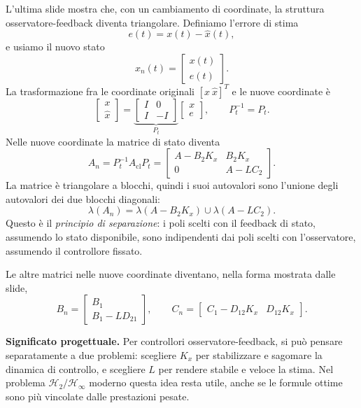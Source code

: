 \documentclass[11pt,a4paper]{article}
\begin{document}
L'ultima slide mostra che, con un cambiamento di coordinate, la struttura osservatore-feedback diventa triangolare. Definiamo l'errore di stima
$$
e(t)=x(t)-\hat{x}(t),
$$
e usiamo il nuovo stato
$$
x_n(t)=
\begin{bmatrix}
x(t)\\
e(t)
\end{bmatrix}.
$$
La trasformazione fra le coordinate originali $[x\ \hat{x}]^T$ e le nuove coordinate \`e
$$
\begin{bmatrix}
x\\
\hat{x}
\end{bmatrix}
=
\underbrace{
\begin{bmatrix}
I & 0\\
I & -I
\end{bmatrix}}_{P_t}
\begin{bmatrix}
x\\
e
\end{bmatrix},
\qquad
P_t^{-1}=P_t.
$$
Nelle nuove coordinate la matrice di stato diventa
$$
A_n
=
P_t^{-1}A_{\mathrm{cl}}P_t
=
\begin{bmatrix}
A-B_2K_x & B_2K_x\\
0 & A-LC_2
\end{bmatrix}.
$$
La matrice \`e triangolare a blocchi, quindi i suoi autovalori sono l'unione degli autovalori dei due blocchi diagonali:
$$
\lambda(A_n)
=
\lambda(A-B_2K_x)
\cup
\lambda(A-LC_2).
$$
Questo \`e il \emph{principio di separazione}: i poli scelti con il feedback di stato, assumendo lo stato disponibile, sono indipendenti dai poli scelti con l'osservatore, assumendo il controllore fissato.

Le altre matrici nelle nuove coordinate diventano, nella forma mostrata dalle slide,
$$
B_n=
\begin{bmatrix}
B_1\\
B_1-LD_{21}
\end{bmatrix},
\qquad
C_n=
\begin{bmatrix}
C_1-D_{12}K_x & D_{12}K_x
\end{bmatrix}.
$$

\begin{focusbox}
\textbf{Significato progettuale.} Per controllori osservatore-feedback, si pu\`o pensare separatamente a due problemi: scegliere $K_x$ per stabilizzare e sagomare la dinamica di controllo, e scegliere $L$ per rendere stabile e veloce la stima. Nel problema $\mathcal{H}_2/\mathcal{H}_\infty$ moderno questa idea resta utile, anche se le formule ottime sono pi\`u vincolate dalle prestazioni pesate.
\end{focusbox}
\end{document}

